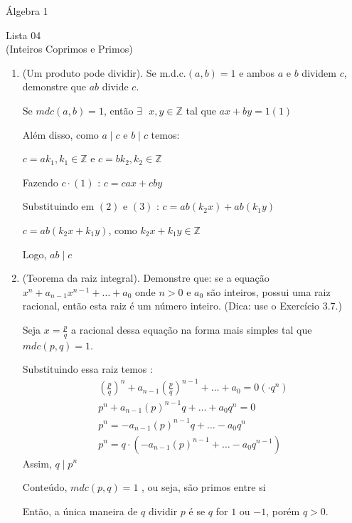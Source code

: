 \documentclass[a4paper,12pt]{article}
\begin{document}
\begin{center}
    Álgebra 1 
\end{center}

\begin{center}
    \large Lista 04 \\
    \small (Inteiros Coprimos e Primos)
\end{center}

\begin{enumerate}[label=4.\arabic*.]
    \item (Um produto pode dividir). Se m.d.c.$(a,b) = 1$ e ambos $a$ e $b$ dividem $c$, demonstre que $ab$ divide $c$.
    
    Se $mdc(a,b) = 1$, então $ \exists \text{ } x,y \in \mathbb{Z}$ tal que $ax + by = 1 (1)$

    Além disso, como $a \mid c$ e $b \mid c$ temos:
    
    $c = a k_1, k_1 \in \mathbb{Z}$ e $c = b k_2, k_2 \in \mathbb{Z}$ 
    
    Fazendo $c \cdot (1)$ : $c = cax + cby$

    Substituindo em $(2)$ e $(3)$ : 
    $c = ab(k_2x) + ab(k_1y)$

    $c = ab(k_2x + k_1y)$, como $k_2x + k_1y \in \mathbb{Z}$
    
    Logo, $ab \mid c$

    \item (Teorema da raiz integral). Demonstre que: se a equação $x^n + a_{n-1} x^{n-1} + \dots + a_0$ onde $n > 0$ e $a_0$ são inteiros, possui uma raiz racional, então esta raiz é um número inteiro. (Dica: use o Exercício 3.7.)
    
    Seja $x = \frac{p}{q}$ a racional dessa equação na forma mais simples tal que $mdc(p,q) = 1$.

    Substituindo essa raiz temos : 
    \begin{align*}
            (\frac{p}{q})^n + a_{n-1}(\frac{p}{q})^{n-1} + \ldots + a_0 = 0 (\cdot q^n) \\
            p^n + a_{n-1}(p)^{n-1}q + \ldots + a_0q^n = 0 \\ 
            p^n = - a_{n-1}(p)^{n-1}q + \ldots - a_0q^n \\
            p^n = q \cdot (- a_{n-1}(p)^{n-1} + \ldots - a_0q^{n-1})
    \end{align*}
    Assim, $q \mid p^n$

    Conteúdo, $mdc(p,q) = 1$ , ou seja, são primos entre si

    Então, a única maneira de $q$ dividir $p$ é se $q$ for $1$ ou $-1$, porém $q > 0$.


\end{enumerate}
\end{document}
